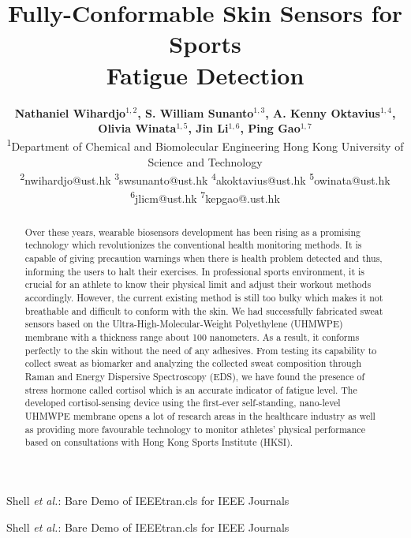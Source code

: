 \documentclass[journal]{IEEEtran}
\begin{document}
\title{Fully-Conformable Skin Sensors for Sports\\Fatigue Detection}

\author{\textbf{Nathaniel Wihardjo$^{1,2}$, 
        S. William Sunanto$^{1,3}$,
        A. Kenny Oktavius$^{1,4}$, \\
        Olivia Winata$^{1,5}$, 
        Jin Li$^{1,6}$, 
        Ping Gao$^{1,7}$} \\
        {\small 
            \textsuperscript{1}Department of Chemical and Biomolecular Engineering Hong Kong University of Science and Technology \\
            \textsuperscript{2}nwihardjo@ust.hk
            \textsuperscript{3}swsunanto@ust.hk
            \textsuperscript{4}akoktavius@ust.hk
            \textsuperscript{5}owinata@ust.hk
            \textsuperscript{6}jlicm@ust.hk
            \textsuperscript{7}kepgao@.ust.hk}}%

{Shell \MakeLowercase{\textit{et al.}}: Bare Demo of IEEEtran.cls for IEEE Journals}

\maketitle

{Shell \MakeLowercase{\textit{et al.}}: Bare Demo of IEEEtran.cls for IEEE Journals}

\maketitle

\begin{abstract}
Over these years, wearable biosensors development has been rising as a promising technology which revolutionizes the conventional health monitoring methods. It is capable of giving precaution warnings when there is health problem detected and thus, informing the users to halt their exercises. In professional sports environment, it is crucial for an athlete to know their physical limit and adjust their workout methods accordingly. However, the current existing method is still too bulky which makes it not breathable and difficult to conform with the skin. We had successfully fabricated sweat sensors based on the Ultra-High-Molecular-Weight Polyethylene (UHMWPE) membrane with a thickness range about 100 nanometers. As a result, it conforms perfectly to the skin without the need of any adhesives. From testing its capability to collect sweat as biomarker and analyzing the collected sweat composition through Raman and Energy Dispersive Spectroscopy (EDS), we have found the presence of stress hormone called cortisol which is an accurate indicator of fatigue level. The developed cortisol-sensing device using the first-ever self-standing, nano-level UHMWPE membrane opens a lot of research areas in the healthcare industry as well as providing more favourable technology to monitor athletes’ physical performance based on consultations with Hong Kong Sports Institute (HKSI).
\end{abstract}
\end{document}
